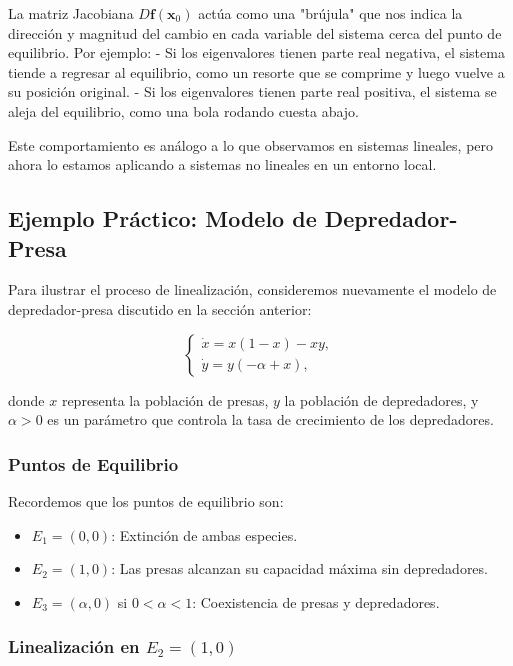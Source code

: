 La matriz Jacobiana $D\mathbf{f}(\mathbf{x}_0)$ actúa como una "brújula" que nos indica la dirección y magnitud del cambio en cada variable del sistema cerca del punto de equilibrio. Por ejemplo:
- Si los eigenvalores tienen parte real negativa, el sistema tiende a regresar al equilibrio, como un resorte que se comprime y luego vuelve a su posición original.
- Si los eigenvalores tienen parte real positiva, el sistema se aleja del equilibrio, como una bola rodando cuesta abajo.

Este comportamiento es análogo a lo que observamos en sistemas lineales, pero ahora lo estamos aplicando a sistemas no lineales en un entorno local.

\subsection{Ejemplo Práctico: Modelo de Depredador-Presa}

Para ilustrar el proceso de linealización, consideremos nuevamente el modelo de depredador-presa discutido en la sección anterior:

\begin{equation}\label{eq:ejemplo_sistema}
    \begin{cases}
        \dot{x} = x (1 - x) - xy, \\
        \dot{y} = y (-\alpha + x),
    \end{cases}
\end{equation}

donde $x$ representa la población de presas, $y$ la población de depredadores, y $\alpha > 0$ es un parámetro que controla la tasa de crecimiento de los depredadores.

\subsubsection{Puntos de Equilibrio}

Recordemos que los puntos de equilibrio son:
\begin{itemize}
    \item $E_1 = (0, 0)$: Extinción de ambas especies.
    \item $E_2 = (1, 0)$: Las presas alcanzan su capacidad máxima sin depredadores.
    \item $E_3 = (\alpha, 0)$ si $0 < \alpha < 1$: Coexistencia de presas y depredadores.
\end{itemize}

\subsubsection{Linealización en $E_2 = (1, 0)$}

